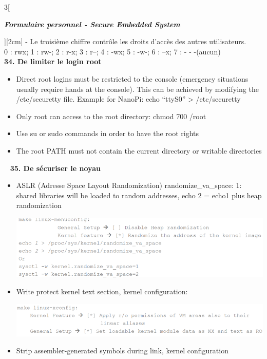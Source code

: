 \begin{multicols}{3}[\centerline{ \large\em \textbf{Formulaire personnel - Secure Embedded System}}][2cm]
- Le troisième chiffre contrôle les droits d'accès des autres utilisateurs.\\
0 : rwx; 1 : rw-; 2 : r-x; 3 : r--; 4 : -wx; 5 : -w-; 6 : --x; 7 : - - -(aucun)
\\ \textbf{34. De limiter le login root}
\begin{itemize}
\item Direct root logins must be restricted to the console (emergency situations usually require
hands at the console). This can be achieved by modifying the /etc/securetty file.
Example for NanoPi: echo “ttyS0” > /etc/securetty
\item Only root can access to the root directory: chmod 700 /root
\item Use su or sudo commands in order to have the root rights
\item The root PATH must not contain the current directory or writable directories
\end{itemize}~
\textbf{35. De sécuriser le noyau}~
\begin{itemize}
\item ASLR (Adresse Space Layout Randomization) randomize\_va\_space: 1: shared libraries will be loaded to random addresses, echo 2 = echo1 plus heap randomization\\
\begin{minipage}{\linewidth}
	\centering
    \includegraphics[width =0.8\columnwidth]{images/19.png}
\end{minipage}
\item Write protect kernel text section, kernel configuration:\\
\begin{minipage}{\linewidth}
	\centering
    \includegraphics[width =0.8\columnwidth]{images/20.png}
\end{minipage}
\item Strip assembler-generated symbols during link, kernel configuration\\
\begin{minipage}{\linewidth}

\end{minipage}
\end{itemize}
\end{multicols}
